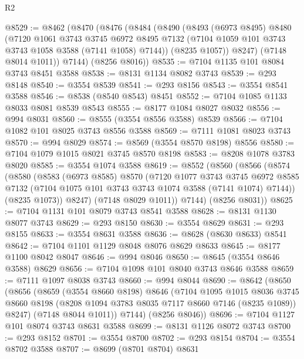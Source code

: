 \begin{lexlean}{R2}
\begin{coremodule}
@8529 := @8462
    (@8470
      (@8476
        (@8484
          (@8490
            (@8493
              (@6973 @8495)
              @8480
              (@7120
                @1061
                @3743
                @3745
                @6972
                @8495
                @7132
                (@7104 @1059 @101 @3743 @3743 @1058 @3588 (@7141 @1058) @7144))
              (@8235 @1057))
            @8247)
          (@7148 @8014 @1011))
        @7144)
      (@8256 @8016))
@8535 := @7104 @1135 @101 @8084 @3743 @8451 @3588
@8538 := @8131 @1134 @8082 @3743
@8539 := @293 @8148
@8540 := @3554 @8539
@8541 := @293 @8156
@8543 := @3554 @8541 @3588
@8546 := @8538 (@8540 @8543) @8451
@8552 := @7104 @1085 @1133 @8033 @8081 @8539 @8543
@8555 := @8177 @1084 @8027 @8032
@8556 := @994 @8031
@8560 := @8555 (@3554 @8556 @3588) @8539
@8566 := @7104 @1082 @101 @8025 @3743 @8556 @3588
@8569 := @7111 @1081 @8023 @3743
@8570 := @994 @8029
@8574 := @8569 (@3554 @8570 @8198) @8556
@8580 := @7104 @1079 @1015 @8021 @3745 @8570 @8198
@8583 := @8208 @1078 @3783 @8020
@8585 := @3554 @1074 @3588
@8619 := @8552
    (@8560
      (@8566
        (@8574
          (@8580
            (@8583
              (@6973 @8585)
              @8570
              (@7120
                @1077
                @3743
                @3745
                @6972
                @8585
                @7132
                (@7104 @1075 @101 @3743 @3743 @1074 @3588 (@7141 @1074) @7144))
              (@8235 @1073))
            @8247)
          (@7148 @8029 @1011))
        @7144)
      (@8256 @8031))
@8625 := @7104 @1131 @101 @8079 @3743 @8541 @3588
@8628 := @8131 @1130 @8077 @3743
@8629 := @293 @8150
@8630 := @3554 @8629
@8631 := @293 @8155
@8633 := @3554 @8631 @3588
@8636 := @8628 (@8630 @8633) @8541
@8642 := @7104 @1101 @1129 @8048 @8076 @8629 @8633
@8645 := @8177 @1100 @8042 @8047
@8646 := @994 @8046
@8650 := @8645 (@3554 @8646 @3588) @8629
@8656 := @7104 @1098 @101 @8040 @3743 @8646 @3588
@8659 := @7111 @1097 @8038 @3743
@8660 := @994 @8044
@8690 := @8642
    (@8650
      (@8656
        (@8659
          (@3554 @8660 @8198)
          @8646
          (@7104
            @1095
            @1015
            @8036
            @3745
            @8660
            @8198
            (@8208 @1094 @3783 @8035 @7117 @8660 @7146 (@8235 @1089))
            @8247)
          (@7148 @8044 @1011))
        @7144)
      (@8256 @8046))
@8696 := @7104 @1127 @101 @8074 @3743 @8631 @3588
@8699 := @8131 @1126 @8072 @3743
@8700 := @293 @8152
@8701 := @3554 @8700
@8702 := @293 @8154
@8704 := @3554 @8702 @3588
@8707 := @8699 (@8701 @8704) @8631

\end{coremodule}
\end{lexlean}
